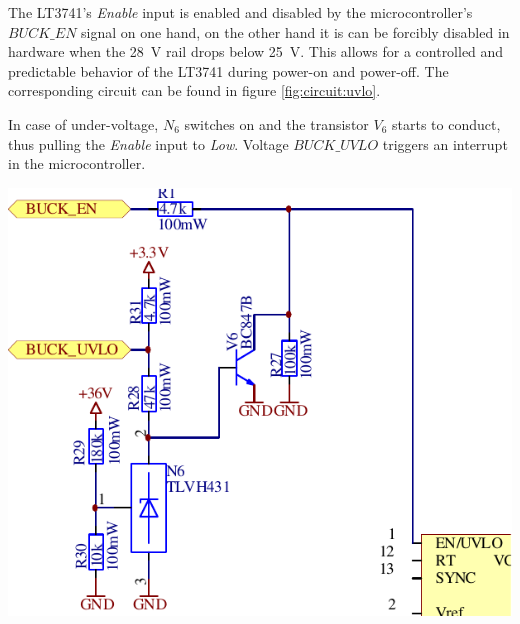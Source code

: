 \begin{minipage}{0.5\textwidth}
    The  LT3741's  \emph{Enable}   input  is  enabled  and   disabled  by  the
    microcontroller's $BUCK\_EN$ signal  on one hand, on the other  hand it is
    can  be  forcibly  disabled  in  hardware  when  the  \SI{28}{\volt}  rail
    drops below  \SI{25}{\volt}. This allows for a  controlled and predictable
    behavior of  the LT3741  during power-on and  power-off. The corresponding
    circuit can be found in figure \ref{fig:circuit:uvlo}.

    In  case of  under-voltage, $N_6$  switches  on and  the transistor  $V_6$
    starts to  conduct, thus  pulling the  \emph{Enable} input  to \emph{Low}.
    Voltage $BUCK\_UVLO$ triggers an interrupt in the microcontroller.
\end{minipage}
\begin{minipage}{0.5\textwidth}
    \center
    \includegraphics[width=.8\textwidth]{images/circuit/uvlo.pdf}
    \label{fig:circuit:uvlo}
\end{minipage}
